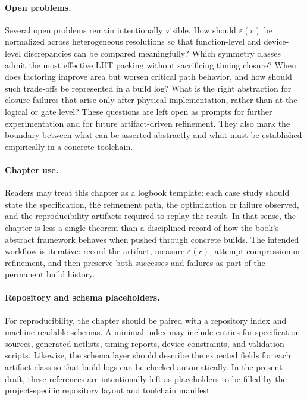 \documentclass[11pt]{article}
\begin{document}
\paragraph{Open problems.}
Several open problems remain intentionally visible. How should \(\varepsilon(r)\) be normalized across heterogeneous resolutions so that function-level and device-level discrepancies can be compared meaningfully? Which symmetry classes admit the most effective LUT packing without sacrificing timing closure? When does factoring improve area but worsen critical path behavior, and how should such trade-offs be represented in a build log? What is the right abstraction for closure failures that arise only after physical implementation, rather than at the logical or gate level? These questions are left open as prompts for further experimentation and for future artifact-driven refinement. They also mark the boundary between what can be asserted abstractly and what must be established empirically in a concrete toolchain.

\paragraph{Chapter use.}
Readers may treat this chapter as a logbook template: each case study should state the specification, the refinement path, the optimization or failure observed, and the reproducibility artifacts required to replay the result. In that sense, the chapter is less a single theorem than a disciplined record of how the book's abstract framework behaves when pushed through concrete builds. The intended workflow is iterative: record the artifact, measure \(\varepsilon(r)\), attempt compression or refinement, and then preserve both successes and failures as part of the permanent build history.

\paragraph{Repository and schema placeholders.}
For reproducibility, the chapter should be paired with a repository index and machine-readable schemas. A minimal index may include entries for specification sources, generated netlists, timing reports, device constraints, and validation scripts. Likewise, the schema layer should describe the expected fields for each artifact class so that build logs can be checked automatically. In the present draft, these references are intentionally left as placeholders to be filled by the project-specific repository layout and toolchain manifest.
\end{document}
